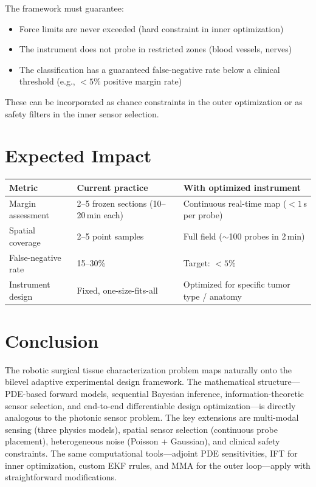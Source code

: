 \documentclass[11pt,a4paper]{article}
\theoremstyle{definition}
\begin{document}
The framework must guarantee:
\begin{itemize}[nosep]
  \item Force limits are never exceeded (hard constraint in inner optimization)
  \item The instrument does not probe in restricted zones (blood vessels, nerves)
  \item The classification has a guaranteed false-negative rate below a clinical threshold (e.g., $<5\%$ positive margin rate)
\end{itemize}

These can be incorporated as chance constraints in the outer optimization or as safety filters in the inner sensor selection.

\section{Expected Impact}

\begin{center}
\renewcommand{\arraystretch}{1.3}
\begin{tabular}{@{}p{4cm}p{4cm}p{5cm}@{}}
\toprule
\textbf{Metric} & \textbf{Current practice} & \textbf{With optimized instrument} \\
\midrule
Margin assessment & 2--5 frozen sections (10--20\,min each) & Continuous real-time map ($<1$\,s per probe) \\
Spatial coverage & 2--5 point samples & Full field ($\sim$100 probes in 2\,min) \\
False-negative rate & 15--30\% & Target: $<5\%$ \\
Instrument design & Fixed, one-size-fits-all & Optimized for specific tumor type / anatomy \\
\bottomrule
\end{tabular}
\end{center}

\section{Conclusion}

The robotic surgical tissue characterization problem maps naturally onto the bilevel adaptive experimental design framework.  The mathematical structure---PDE-based forward models, sequential Bayesian inference, information-theoretic sensor selection, and end-to-end differentiable design optimization---is directly analogous to the photonic sensor problem.  The key extensions are multi-modal sensing (three physics models), spatial sensor selection (continuous probe placement), heterogeneous noise (Poisson + Gaussian), and clinical safety constraints.  The same computational tools---adjoint PDE sensitivities, IFT for inner optimization, custom EKF rrules, and MMA for the outer loop---apply with straightforward modifications.
\end{document}
